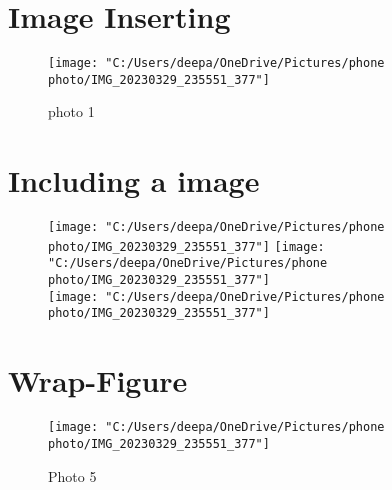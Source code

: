 \documentclass[a4paper]{article}
\begin{document}
	\section{Image Inserting}
	\blindtext
	\begin{figure}[ht]
		\centering
		\texttt{[image: "C:/Users/deepa/OneDrive/Pictures/phone photo/IMG\_20230329\_235551\_377"]}
		\caption{photo 1}
	\end{figure}
	\blindtext
	\pagebreak
	\section{Including a image}
	\blindtext
	\begin{figure}[h]
		\centering
		{ \texttt{[image: "C:/Users/deepa/OneDrive/Pictures/phone photo/IMG\_20230329\_235551\_377"]}
		} \hfill
		{ \texttt{[image: "C:/Users/deepa/OneDrive/Pictures/phone photo/IMG\_20230329\_235551\_377"]}
		} \\
		{\texttt{[image: "C:/Users/deepa/OneDrive/Pictures/phone photo/IMG\_20230329\_235551\_377"]}
		} \\
	\end{figure}
	\section{Wrap-Figure}
	\blindtext
	\begin{wrapfigure}{l}{4cm}
		\texttt{[image: "C:/Users/deepa/OneDrive/Pictures/phone photo/IMG\_20230329\_235551\_377"]}
		\caption{Photo 5}
	\end{wrapfigure}
	\blindtext
\end{document}
